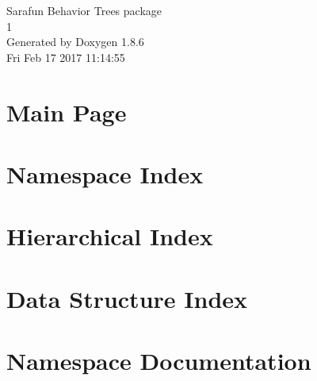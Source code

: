 \documentclass[twoside]{book}
\newcommand{\clearemptydoublepage}{%
  \newpage{\pagestyle{empty}\cleardoublepage}%
}
\begin{document}
\hypersetup{pageanchor=false}
\begin{titlepage}
\vspace*{7cm}
\begin{center}%
{\Large Sarafun Behavior Trees package \\[1ex]\large 1 }\\
\vspace*{1cm}
{\large Generated by Doxygen 1.8.6}\\
\vspace*{0.5cm}
{\small Fri Feb 17 2017 11:14:55}\\
\end{center}
\end{titlepage}
\clearemptydoublepage
\tableofcontents
\clearemptydoublepage
{}
\hypersetup{pageanchor=true}

\chapter{Main Page}
\label{index}\hypertarget{index}{}
\chapter{Namespace Index}

\chapter{Hierarchical Index}

\chapter{Data Structure Index}

\chapter{Namespace Documentation}



\end{document}
